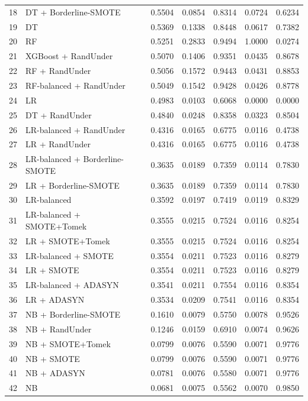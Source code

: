 \begin{center}
\begin{longtable}{clccccc}
18 & DT + Borderline-SMOTE & 0.5504 & 0.0854 & 0.8314 & 0.0724 & 0.6234 \\
19 & DT & 0.5369 & 0.1338 & 0.8448 & 0.0617 & 0.7382 \\
20 & RF & 0.5251 & 0.2833 & 0.9494 & 1.0000 & 0.0274 \\
21 & XGBoost + RandUnder & 0.5070 & 0.1406 & 0.9351 & 0.0435 & 0.8678 \\
22 & RF + RandUnder & 0.5056 & 0.1572 & 0.9443 & 0.0431 & 0.8853 \\
23 & RF-balanced + RandUnder & 0.5049 & 0.1542 & 0.9428 & 0.0426 & 0.8778 \\
24 & LR & 0.4983 & 0.0103 & 0.6068 & 0.0000 & 0.0000 \\
25 & DT + RandUnder & 0.4840 & 0.0248 & 0.8358 & 0.0323 & 0.8504 \\
26 & LR-balanced + RandUnder & 0.4316 & 0.0165 & 0.6775 & 0.0116 & 0.4738 \\
27 & LR + RandUnder & 0.4316 & 0.0165 & 0.6775 & 0.0116 & 0.4738 \\
28 & LR-balanced + Borderline-SMOTE & 0.3635 & 0.0189 & 0.7359 & 0.0114 & 0.7830 \\
29 & LR + Borderline-SMOTE & 0.3635 & 0.0189 & 0.7359 & 0.0114 & 0.7830 \\
30 & LR-balanced & 0.3592 & 0.0197 & 0.7419 & 0.0119 & 0.8329 \\
31 & LR-balanced + SMOTE+Tomek & 0.3555 & 0.0215 & 0.7524 & 0.0116 & 0.8254 \\
32 & LR + SMOTE+Tomek & 0.3555 & 0.0215 & 0.7524 & 0.0116 & 0.8254 \\
33 & LR-balanced + SMOTE & 0.3554 & 0.0211 & 0.7523 & 0.0116 & 0.8279 \\
34 & LR + SMOTE & 0.3554 & 0.0211 & 0.7523 & 0.0116 & 0.8279 \\
35 & LR-balanced + ADASYN & 0.3541 & 0.0211 & 0.7554 & 0.0116 & 0.8354 \\
36 & LR + ADASYN & 0.3534 & 0.0209 & 0.7541 & 0.0116 & 0.8354 \\
37 & NB + Borderline-SMOTE & 0.1610 & 0.0079 & 0.5750 & 0.0078 & 0.9526 \\
38 & NB + RandUnder & 0.1246 & 0.0159 & 0.6910 & 0.0074 & 0.9626 \\
39 & NB + SMOTE+Tomek & 0.0799 & 0.0076 & 0.5590 & 0.0071 & 0.9776 \\
40 & NB + SMOTE & 0.0799 & 0.0076 & 0.5590 & 0.0071 & 0.9776 \\
41 & NB + ADASYN & 0.0781 & 0.0076 & 0.5580 & 0.0071 & 0.9776 \\
42 & NB & 0.0681 & 0.0075 & 0.5562 & 0.0070 & 0.9850 \\
\end{longtable}
\end{center}
